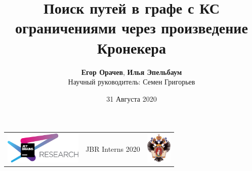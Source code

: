 \documentclass[xcolor=table,english,russian]{beamer}
\title[Kronecker Product CFPQ]{Поиск путей в графе с КС ограничениями через произведение Кронекера}
\institute[СПбГУ]{
JetBrains Research, Лаборатория языковых инструментов  \\
Санкт-Петербургский Государственный университет
}
\author[Егор Орачев, Илья Эпельбаум]{\textbf{Егор Орачев}, \textbf{Илья Эпельбаум} \\ Научный руководитель: Семен Григорьев}
\date{31 Августа 2020}
\begin{document}
{
\begin{frame}[fragile]
  \begin{table}
  \centering
  \begin{tabularx}{\linewidth}{YcX}
    \includegraphics[height=1.5cm]{pictures/jetbrainsResearch.pdf} \hfill
    & \begin{minipage}[t]{0.3\textwidth}\center \vspace{-1cm}  JBR Interns 2020
      \end{minipage}
    & \hfill \includegraphics[height=1.5cm]{pictures/SPbGU_Logo.png}
  \end{tabularx}
  \end{table}
  \titlepage
\end{frame}
}
\end{document}
